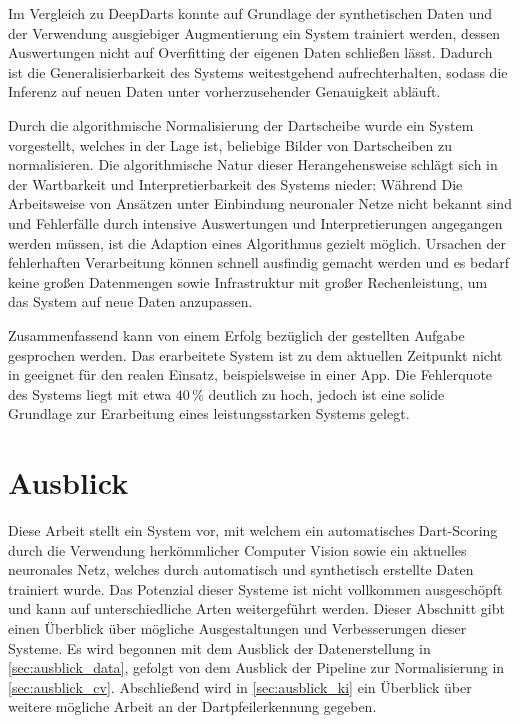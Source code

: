 Im Vergleich zu DeepDarts konnte auf Grundlage der synthetischen Daten und der Verwendung ausgiebiger Augmentierung ein System trainiert werden, dessen Auswertungen nicht auf Overfitting der eigenen Daten schließen lässt. Dadurch ist die Generalisierbarkeit des Systems weitestgehend aufrechterhalten, sodass die Inferenz auf neuen Daten unter vorherzusehender Genauigkeit abläuft.

Durch die algorithmische Normalisierung der Dartscheibe wurde ein System vorgestellt, welches in der Lage ist, beliebige Bilder von Dartscheiben zu normalisieren. Die algorithmische Natur dieser Herangehensweise schlägt sich in der Wartbarkeit und Interpretierbarkeit des Systems nieder: Während Die Arbeitsweise von Ansätzen unter Einbindung neuronaler Netze nicht bekannt sind und Fehlerfälle durch intensive Auswertungen und Interpretierungen angegangen werden müssen, ist die Adaption eines Algorithmus gezielt möglich. Ursachen der fehlerhaften Verarbeitung können schnell ausfindig gemacht werden und es bedarf keine großen Datenmengen sowie Infrastruktur mit großer Rechenleistung, um das System auf neue Daten anzupassen.

Zusammenfassend kann von einem Erfolg bezüglich der gestellten Aufgabe gesprochen werden. Das erarbeitete System ist zu dem aktuellen Zeitpunkt nicht in geeignet für den realen Einsatz, beispielsweise in einer App. Die Fehlerquote des Systems liegt mit etwa $40\,\%$ deutlich zu hoch, jedoch ist eine solide Grundlage zur Erarbeitung eines leistungsstarken Systems gelegt.


\section{Ausblick}
\label{sec:ausblick}

Diese Arbeit stellt ein System vor, mit welchem ein automatisches Dart-Scoring durch die Verwendung herkömmlicher Computer Vision sowie ein aktuelles neuronales Netz, welches durch automatisch und synthetisch erstellte Daten trainiert wurde. Das Potenzial dieser Systeme ist nicht vollkommen ausgeschöpft und kann auf unterschiedliche Arten weitergeführt werden. Dieser Abschnitt gibt einen Überblick über mögliche Ausgestaltungen und Verbesserungen dieser Systeme. Es wird begonnen mit dem Ausblick der Datenerstellung in \autoref{sec:ausblick_data}, gefolgt von dem Ausblick der Pipeline zur Normalisierung in \autoref{sec:ausblick_cv}. Abschließend wird in \autoref{sec:ausblick_ki} ein Überblick über weitere mögliche Arbeit an der Dartpfeilerkennung gegeben.

